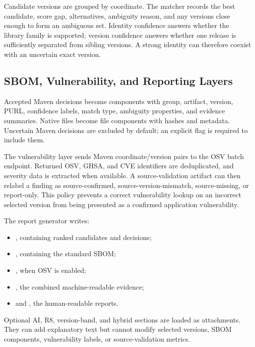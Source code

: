 Candidate versions are grouped by coordinate. The matcher records the best
candidate, score gap, alternatives, ambiguity reason, and any versions close
enough to form an ambiguous set. Identity confidence answers whether the
library family is supported; version confidence answers whether one release
is sufficiently separated from sibling versions. A strong identity can
therefore coexist with an uncertain exact version.

\subsection{SBOM, Vulnerability, and Reporting Layers}

Accepted Maven decisions become \CycloneDX components with group, artifact,
version, PURL, confidence labels, match type, ambiguity properties, and
evidence summaries. Native files become \CycloneDX file components with hashes
and metadata. Uncertain Maven decisions are excluded by default; an explicit
flag is required to include them.

The vulnerability layer sends Maven coordinate/version pairs to the OSV batch
endpoint. Returned OSV, GHSA, and CVE identifiers are deduplicated, and
severity data is extracted when available. A source-validation artifact can
then relabel a finding as source-confirmed, source-version-mismatch,
source-missing, or report-only. This policy prevents a correct vulnerability
lookup on an incorrect selected version from being presented as a confirmed
application vulnerability.

The report generator writes:

\begin{itemize}
  \item {}, containing ranked candidates and decisions;
  \item {}, containing the standard SBOM;
  \item {}, when OSV is enabled;
  \item {}, the combined machine-readable evidence;
  \item {} and , the human-readable reports.
\end{itemize}

Optional AI, R8, version-band, and hybrid sections are loaded as attachments.
They can add explanatory text but cannot modify selected versions, SBOM
components, vulnerability labels, or source-validation metrics.

